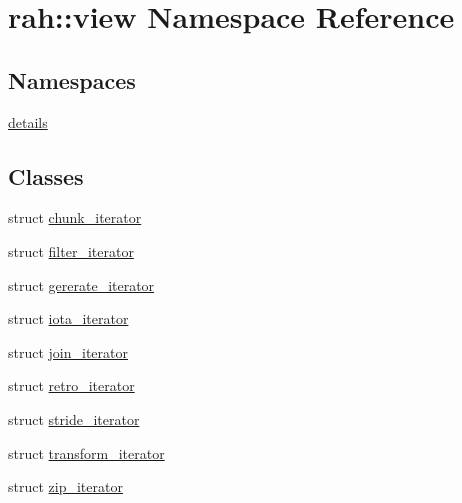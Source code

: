 \hypertarget{namespacerah_1_1view}{}\section{rah\+::view Namespace Reference}
\label{namespacerah_1_1view}
\subsection*{Namespaces}
\begin{DoxyCompactItemize}
\item 
 \mbox{\hyperlink{namespacerah_1_1view_1_1details}{details}}
\end{DoxyCompactItemize}
\subsection*{Classes}
\begin{DoxyCompactItemize}
\item 
struct \mbox{\hyperlink{structrah_1_1view_1_1chunk__iterator}{chunk\+\_\+iterator}}
\item 
struct \mbox{\hyperlink{structrah_1_1view_1_1filter__iterator}{filter\+\_\+iterator}}
\item 
struct \mbox{\hyperlink{structrah_1_1view_1_1gererate__iterator}{gererate\+\_\+iterator}}
\item 
struct \mbox{\hyperlink{structrah_1_1view_1_1iota__iterator}{iota\+\_\+iterator}}
\item 
struct \mbox{\hyperlink{structrah_1_1view_1_1join__iterator}{join\+\_\+iterator}}
\item 
struct \mbox{\hyperlink{structrah_1_1view_1_1retro__iterator}{retro\+\_\+iterator}}
\item 
struct \mbox{\hyperlink{structrah_1_1view_1_1stride__iterator}{stride\+\_\+iterator}}
\item 
struct \mbox{\hyperlink{structrah_1_1view_1_1transform__iterator}{transform\+\_\+iterator}}
\item 
struct \mbox{\hyperlink{structrah_1_1view_1_1zip__iterator}{zip\+\_\+iterator}}
\end{DoxyCompactItemize}

